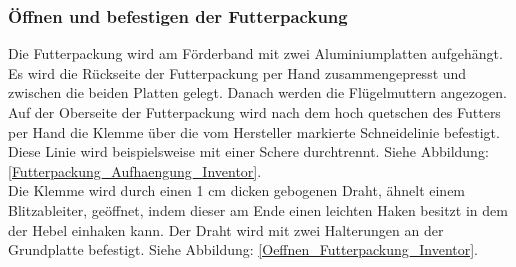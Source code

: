 \subsubsection{Öffnen und befestigen der Futterpackung}

Die Futterpackung wird am Förderband mit zwei Aluminiumplatten aufgehängt. Es wird die Rückseite der Futterpackung per Hand zusammengepresst und zwischen die beiden Platten gelegt. Danach werden die Flügelmuttern angezogen. Auf der Oberseite der Futterpackung wird nach dem hoch quetschen des Futters per Hand die Klemme über die vom Hersteller markierte Schneidelinie befestigt. Diese Linie wird beispielsweise mit einer Schere durchtrennt. Siehe Abbildung: \ref{Futterpackung_Aufhaengung_Inventor}.\\

Die Klemme wird durch einen 1 cm dicken gebogenen Draht, ähnelt einem Blitzableiter, geöffnet, indem dieser am Ende einen leichten Haken besitzt in dem der Hebel einhaken kann. Der Draht wird mit zwei Halterungen an der Grundplatte befestigt. Siehe Abbildung: \ref{Oeffnen_Futterpackung_Inventor}.

